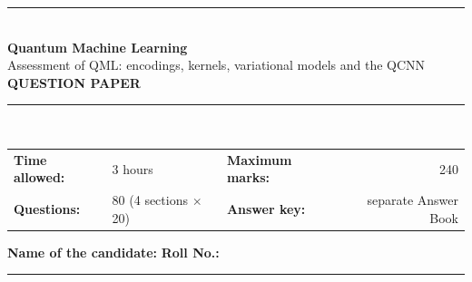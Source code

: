 \documentclass[11pt,a4paper]{article}
\begin{document}
\pagestyle{fancy}\fancyhf{}
\renewcommand{\headrulewidth}{0.4pt}

\thispagestyle{empty}
\begin{center}
{\color{brand}\rule{\linewidth}{1.2pt}}\\[6pt]
{\Huge\bfseries\color{brand} Quantum Machine Learning}\\[4pt]
{\Large Assessment of QML: encodings, kernels, variational models and the QCNN}\\[4pt]
{\large\bfseries QUESTION PAPER}\\[2pt]
{\color{brand}\rule{\linewidth}{1.2pt}}\\[1pt]
\end{center}
\vspace{-2pt}
\begin{tabularx}{\linewidth}{@{}lXlr@{}}
\textbf{Time allowed:} & 3 hours & \textbf{Maximum marks:} & 240\\
\textbf{Questions:} & 80 (4 sections $\times$ 20) & \textbf{Answer key:} & separate Answer Book
\end{tabularx}
\vspace{6pt}

\textbf{Name of the candidate:} \hrulefill\quad \textbf{Roll No.:} \rule{35mm}{0.4pt}
\end{document}
